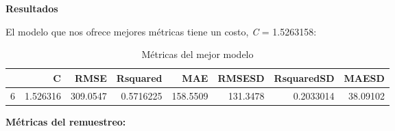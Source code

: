\documentclass[
]{article}
\begin{document}
\textbf{Resultados}

El modelo que nos ofrece mejores métricas tiene un costo, \emph{C} =
1.5263158:

\begin{table}[H]

\caption{\label{tab:unnamed-chunk-38}Métricas del mejor modelo}
\centering
\begin{tabular}[t]{lrrrrrrr}
\toprule
  & C & RMSE & Rsquared & MAE & RMSESD & RsquaredSD & MAESD\\
\midrule
6 & 1.526316 & 309.0547 & 0.5716225 & 158.5509 & 131.3478 & 0.2033014 & 38.09102\\
\bottomrule
\end{tabular}
\end{table}

\textbf{Métricas del remuestreo:}
\end{document}
